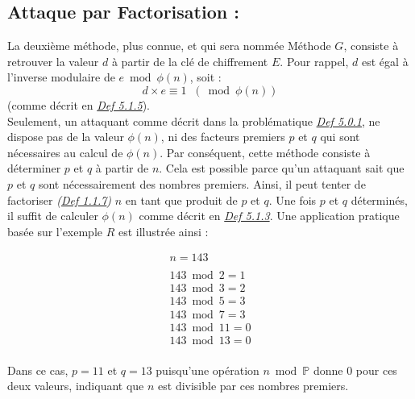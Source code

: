 \documentclass{article}
\begin{document}
\subsection{Attaque par Factorisation
	:}\label{attaque-par-factorisation}

La deuxième méthode, plus connue, et qui sera nommée Méthode \(G\),
consiste à retrouver la valeur \(d\) à partir de la clé de chiffrement
\(E\). Pour rappel, \(d\) est égal à l'inverse modulaire de
\(e \bmod \phi(n)\), soit :
\[ d \times e \equiv 1 \;\; (\bmod \phi(n) ) \](comme décrit en
\textit{\hyperref[def-5.1.5]{Def 5.1.5}}). \\

Seulement, un attaquant comme décrit dans la problématique
\textit{\hyperref[def-5.0.1]{Def 5.0.1}}, ne dispose pas de la valeur
\(\phi(n)\), ni des facteurs premiers \(p\) et \(q\) qui sont
nécessaires au calcul de \(\phi(n)\). Par conséquent, cette méthode
consiste à déterminer \(p\) et \(q\) à partir de \(n\). Cela est
possible parce qu'un attaquant sait que \(p\) et \(q\) sont
nécessairement des nombres premiers. Ainsi, il peut tenter de factoriser
\textit{(\hyperref[def-1.1.7]{Def 1.1.7})} \(n\) en tant que produit de
\(p\) et \(q\). Une fois \(p\) et \(q\) déterminés, il suffit de
calculer \(\phi(n)\) comme décrit en \textit{\hyperref[def-5.1.3]{Def
		5.1.3}}. Une application pratique basée sur l'exemple \(R\) est
illustrée ainsi :

\[ \begin{array}{l}
	n = 143 \\
	\\
	143 \bmod 2 = 1 \\
	143 \bmod 3 = 2 \\
	143 \bmod 5 = 3 \\
	143 \bmod 7 = 3 \\
	143 \bmod 11 = 0 \\
	143 \bmod 13 = 0 \\
\end{array} \]

Dans ce cas, \(p = 11\) et \(q=13\) puisqu'une opération
\(n \bmod \mathbb{P}\) donne \(0\) pour ces deux valeurs, indiquant que
\(n\) est divisible par ces nombres premiers. \\
\end{document}
